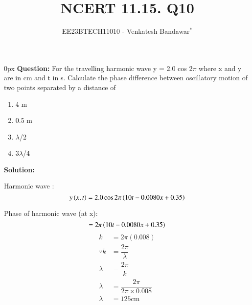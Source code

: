 \documentclass[journal,12pt,twocolumn]{IEEEtran}
\theoremstyle{remark}
\begin{document}

\vspace{3cm}

\title{NCERT 11.15. Q10}
\author{EE23BTECH11010 - Venkatesh Bandawar$^{*}$%
}
\maketitle
\newpage
\bigskip

\renewcommand{\thefigure}{\theenumi}
\renewcommand{\thetable}{\theenumi}



\parindent 0px
\textbf{Question:} For the travelling harmonic wave
y = 2.0 cos 2$\pi$  where x and y are in cm and t in s. Calculate the phase difference between oscillatory
motion of two points separated by a distance of 

\begin{enumerate} [label=(\alph*)]
    \item 4 m
    \item 0.5 m
    \item $\lambda$/2
    \item 3$\lambda$/4
\end{enumerate}

\textbf{Solution:}  
\begin{table}[htbp] \small
\centering

\end{table}
Harmonic wave :
\begin{equation}
    y\left(x, t\right) = 2.0 \cos 2\pi \left(10t - 0.0080 x + 0.35\right)
\end{equation}

Phase of harmonic wave (at x):
\begin{equation}
    = 2\pi \left(10t - 0.0080x + 0.35\right)
\end{equation}
\begin{align}
    k &= 2\pi(0.008) \label{} \\
    \because k &= \dfrac{2\pi}{\lambda} \\
    \lambda &= \dfrac{2\pi}{k} \\
    \lambda &= \dfrac{2\pi}{2 \pi \times 0.008} \\
    \lambda &= 125 \text{cm}
\end{align}
\end{document}
